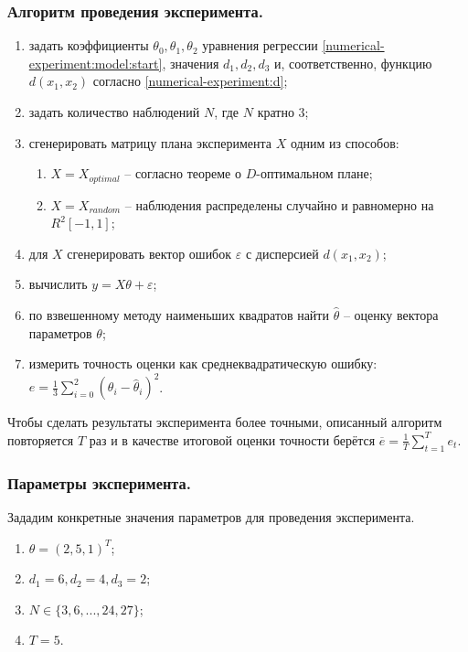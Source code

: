 \subsubsection{Алгоритм проведения эксперимента.}
\begin{enumerate}
	\item \label{numerical-experiment:algo:loop:start}задать коэффициенты $\theta_0, \theta_1, \theta_2$ уравнения регрессии \eqref{numerical-experiment:model:start}, значения $d_1, d_2, d_3$ и, соответственно, функцию $d(x_1, x_2)$ согласно \eqref{numerical-experiment:d};
	\item задать количество наблюдений $N$, где $N$ кратно 3;
	\item сгенерировать матрицу плана эксперимента $X$ одним из способов:
		\begin{enumerate}
			\item $X = X_{optimal}$ -- согласно теореме о $D$-оптимальном плане;
			\item $X = X_{random}$ -- наблюдения распределены случайно и равномерно на $R^2[-1, 1]$;
		\end{enumerate}
	\item для $X$ сгенерировать вектор ошибок $\varepsilon$ с дисперсией $d(x_1, x_2)$;
	\item вычислить $y = X \theta + \varepsilon$;
	\item по взвешенному методу наименьших квадратов найти  $\hat \theta$ -- оценку вектора параметров $\theta$;
	\item \label{numerical-experiment:algo:loop:end} измерить точность оценки как среднеквадратическую ошибку: $e = \frac 1 3 \sum_{i=0}^{2} (\theta_i - \hat \theta_i)^2$. 
\end{enumerate}

Чтобы сделать результаты эксперимента более точными, описанный алгоритм повторяется $T$ раз и в качестве итоговой оценки точности берётся $\overline e = \frac 1 T \sum_{t=1}^{T} e_t$.

\subsubsection{Параметры эксперимента.}
Зададим конкретные значения параметров для проведения эксперимента.
\begin{enumerate}
	\item $\theta = (2, 5, 1)^T$;
	\item $d_1 = 6, d_2 = 4, d_3 = 2$;
	\item $N \in \{3, 6, ..., 24, 27\}$;
	\item $T = 5$.
\end{enumerate} 


